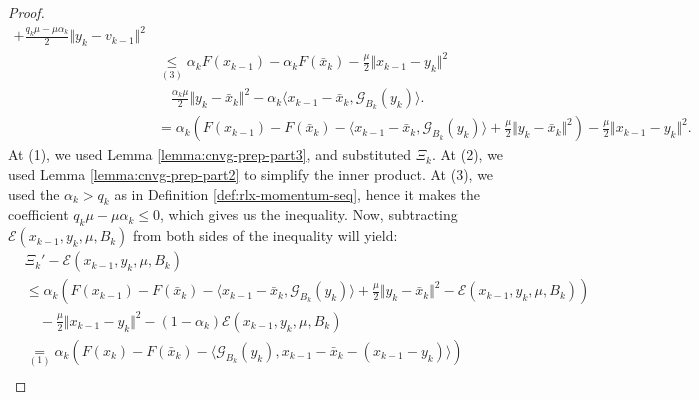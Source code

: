 \documentclass[12pt]{article}
\begin{document}
\begin{proof}
{\begin{align*}
                    + \frac{q_k\mu - \mu\alpha_k}{2}\Vert y_k - v_{k - 1} \Vert^2
                \\
                &\underset{(3)}{\le} 
                \alpha_kF(x_{k - 1}) - \alpha_k F(\bar x_k)
                - \frac{\mu}{2}\Vert x_{k - 1} - y_k\Vert^2 
                    \\&\quad 
                    \frac{\alpha_k\mu}{2}\Vert y_k - \bar x_k\Vert^2
                    - \alpha_k\langle
                        x_{k - 1} - \bar x_k, 
                        \mathcal G_{B_k}(y_k)
                    \rangle. 
                \\
                &= \alpha_k\left(
                    F(x_{k  - 1}) - F(\bar x_k) 
                    - \langle x_{k - 1} - \bar x_k, \mathcal G_{B_k}(y_k)\rangle
                    +  \frac{\mu}{2}\Vert y_k - \bar x_k\Vert^2
                \right)
                - \frac{\mu}{2}\Vert x_{k - 1} - y_k\Vert^2. 
            \end{align*}
            }
            At (1), we used Lemma \ref{lemma:cnvg-prep-part3}, and substituted $\Xi_k$. 
            At (2), we used Lemma \ref{lemma:cnvg-prep-part2} to simplify the inner product. 
            At (3), we used the $\alpha_k > q_k$ as in Definition \ref{def:rlx-momentum-seq}, hence it makes the coefficient $q_k \mu - \mu\alpha_k \le 0$, which gives us the inequality. 
            Now, subtracting $\mathcal E(x_{k - 1}, y_k, \mu, B_k)$ from both sides of the inequality will yield: 
            {\allowdisplaybreaks\small
            \begin{align*}
                & \Xi_k' - \mathcal E(x_{k - 1}, y_k, \mu, B_k)
                \\
                &\le 
                \alpha_k\left(
                    F(x_{k  - 1}) - F(\bar x_k) 
                    - \langle x_{k - 1} - \bar x_k, \mathcal G_{B_k}(y_k)\rangle
                    +  \frac{\mu}{2}\Vert y_k - \bar x_k\Vert^2
                    - \mathcal E(x_{k - 1}, y_k, \mu, B_k)
                \right)
                    \\ &\quad 
                    - \frac{\mu}{2}\Vert x_{k - 1} - y_k\Vert^2
                    - (1 - \alpha_k)\mathcal E(x_{k - 1}, y_k, \mu, B_k)
                \\
                &\underset{(1)}{=} 
                \alpha_k\left(
                    F(x_k) - F(\bar x_k) 
                    - \langle \mathcal G_{B_k}(y_k), x_{k - 1} - \bar x_k - (x_{k - 1} - y_k)\rangle
                \right)
                    \\&\quad 

\end{align*}}
\end{proof}
\end{document}
